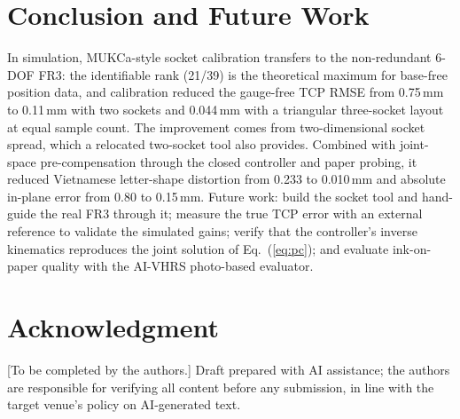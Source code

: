 \documentclass[conference]{IEEEtran}
\begin{document}
\section{Conclusion and Future Work}
In simulation, MUKCa-style socket calibration transfers to the non-redundant 6-DOF FR3: the identifiable rank (21/39) is the
theoretical maximum for base-free position data, and calibration reduced the gauge-free TCP RMSE from 0.75\,mm to 0.11\,mm
with two sockets and 0.044\,mm with a triangular three-socket layout at equal sample count. The improvement comes from
two-dimensional socket spread, which a relocated two-socket tool also provides. Combined with joint-space pre-compensation
through the closed controller and paper probing, it reduced Vietnamese letter-shape distortion from 0.233 to 0.010\,mm and
absolute in-plane error from 0.80 to 0.15\,mm. Future work: build the socket tool and hand-guide the real FR3 through it;
measure the true TCP error with an external reference to validate the simulated gains; verify that the controller's
inverse kinematics reproduces the joint solution of Eq.~(\ref{eq:pc}); and evaluate ink-on-paper quality with the AI-VHRS
photo-based evaluator.

\section*{Acknowledgment}
[To be completed by the authors.] Draft prepared with AI assistance; the authors are responsible for verifying all content
before any submission, in line with the target venue's policy on AI-generated text.



\end{document}
